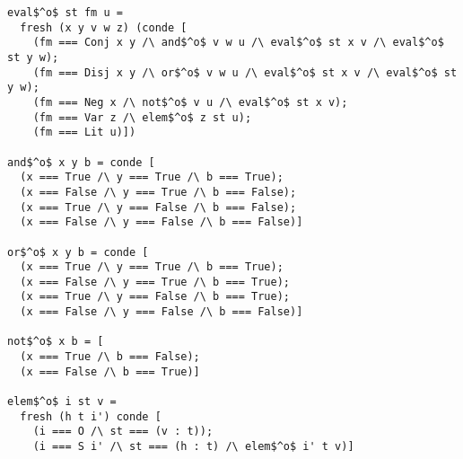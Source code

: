 

\begin{figure*}[!t]
  \centering
  \begin{minipage}{\textwidth}
    \begin{lstlisting}[label={prop}, caption={Relational evaluator of logic formulas}, captionpos=b, frame=tb]
eval$^o$ st fm u =
  fresh (x y v w z) (conde [
    (fm === Conj x y /\ and$^o$ v w u /\ eval$^o$ st x v /\ eval$^o$ st y w);
    (fm === Disj x y /\ or$^o$ v w u /\ eval$^o$ st x v /\ eval$^o$ st y w);
    (fm === Neg x /\ not$^o$ v u /\ eval$^o$ st x v);
    (fm === Var z /\ elem$^o$ z st u);
    (fm === Lit u)])

and$^o$ x y b = conde [
  (x === True /\ y === True /\ b === True);
  (x === False /\ y === True /\ b === False);
  (x === True /\ y === False /\ b === False);
  (x === False /\ y === False /\ b === False)]

or$^o$ x y b = conde [
  (x === True /\ y === True /\ b === True);
  (x === False /\ y === True /\ b === True);
  (x === True /\ y === False /\ b === True);
  (x === False /\ y === False /\ b === False)]

not$^o$ x b = [
  (x === True /\ b === False);
  (x === False /\ b === True)]

elem$^o$ i st v =
  fresh (h t i') conde [
    (i === O /\ st === (v : t));
    (i === S i' /\ st === (h : t) /\ elem$^o$ i' t v)]
    \end{lstlisting}
  \end{minipage}
\end{figure*}